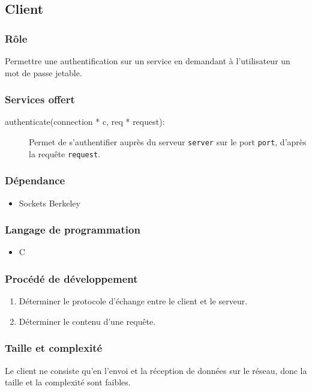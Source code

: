 \documentclass{"../../res/univ-projet"}
\begin{document}
\subsection{Client}
    \subsubsection{Rôle}
        Permettre une authentification sur un service en demandant à
    l'utilisateur un mot de passe jetable.

    \subsubsection{Services offert}
    \begin{description}
        \item[authenticate(connection * c, req * request):] Permet
            de s'authentifier auprès du serveur \verb?server? sur 
            le port \verb?port?, d'après la requête \verb?request?.
    \end{description}

    \subsubsection{Dépendance}
    \begin{itemize}
        \item Sockets Berkeley
    \end{itemize}

    \subsubsection{Langage de programmation}
    \begin{itemize}
        \item C
    \end{itemize}

    \subsubsection{Procédé de développement}
    \begin{enumerate}
        \item Déterminer le protocole d'échange entre le client et le
            serveur.
        \item Déterminer le contenu d'une requête.
    \end{enumerate}

    \subsubsection{Taille et complexité}
        Le client ne consiste qu'en l'envoi et la réception de données sur le
        réseau, donc la taille et la complexité sont faibles.
\end{document}

